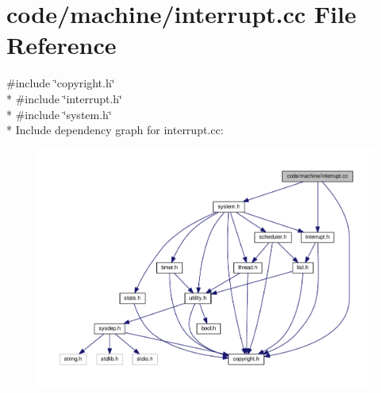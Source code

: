 \section{code/machine/interrupt.cc File Reference}
\label{interrupt_8cc}
{\ttfamily \#include \char`\"{}copyright.\+h\char`\"{}}\\*
{\ttfamily \#include \char`\"{}interrupt.\+h\char`\"{}}\\*
{\ttfamily \#include \char`\"{}system.\+h\char`\"{}}\\*
Include dependency graph for interrupt.\+cc\+:
\nopagebreak
\begin{figure}[H]
\begin{center}
\leavevmode
\includegraphics[width=350pt]{interrupt_8cc__incl}
\end{center}
\end{figure}
